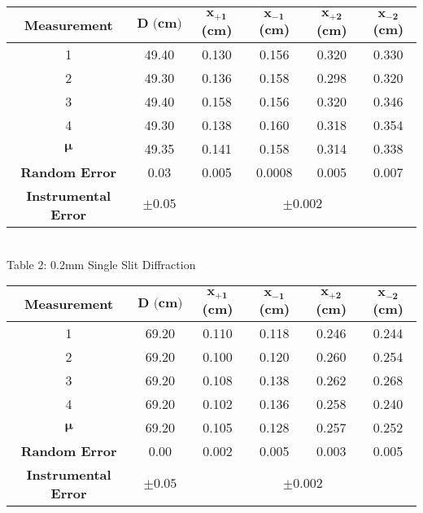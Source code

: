 \begin{center}
    \begin{tabular}{|c|c|c c c c|}
        \hline
        \textbf{Measurement} & $\bm{D\textbf{ (cm)}}$ & $\bm{x_{+1}}$\textbf{(cm)} & $\bm{x_{-1}}$\textbf{(cm)} & $\bm{x_{+2}}$\textbf{(cm)} & $\bm{x_{-2}}$\textbf{(cm)}\\ \hline
        1                     & 49.40& 0.130 & 0.156  & 0.320 & 0.330 \\ 
        2                     & 49.30& 0.136 & 0.158  & 0.298 & 0.320 \\ 
        3                     & 49.40& 0.158 & 0.156  & 0.320 & 0.346 \\ 
        4                     & 49.30& 0.138 & 0.160  & 0.318 & 0.354 \\ \hline \hline
        $\bm{\mu}$            & 49.35& 0.141 & 0.158  & 0.314 & 0.338 \\ 
        \textbf{Random Error} & 0.03 & 0.005 & 0.0008 & 0.005 & 0.007 \\ 
        \textbf{Instrumental Error} & $\pm 0.05$ & \multicolumn{4}{c|}{$\pm 0.002$} \\ \hline
    \end{tabular}
    \vspace{3mm}
    \\Table 2: 0.2mm Single Slit Diffraction\\
    \vspace{5mm}
\newpage
    \begin{tabular}{|c|c|c c c c|}
        \hline
        \textbf{Measurement} & $\bm{D\textbf{ (cm)}}$ & $\bm{x_{+1}}$\textbf{(cm)} & $\bm{x_{-1}}$\textbf{(cm)} & $\bm{x_{+2}}$\textbf{(cm)} & $\bm{x_{-2}}$\textbf{(cm)}\\ \hline
        1                     & 69.20& 0.110 & 0.118  & 0.246 & 0.244 \\ 
        2                     & 69.20& 0.100 & 0.120  & 0.260 & 0.254 \\ 
        3                     & 69.20& 0.108 & 0.138  & 0.262 & 0.268 \\ 
        4                     & 69.20& 0.102 & 0.136  & 0.258 & 0.240 \\ \hline \hline
        $\bm{\mu}$            & 69.20& 0.105 & 0.128  & 0.257 & 0.252 \\ 
        \textbf{Random Error} & 0.00 & 0.002 & 0.005  & 0.003 & 0.005 \\ 
        \textbf{Instrumental Error} & $\pm 0.05$ & \multicolumn{4}{c|}{$\pm 0.002$} \\ \hline

\end{tabular}
\end{center}
